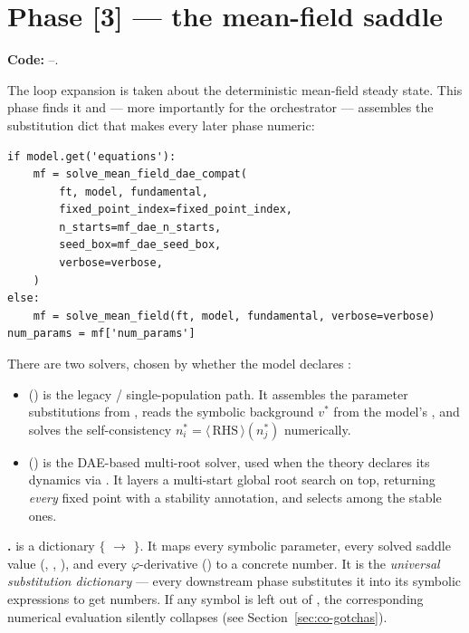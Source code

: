 \section{Phase [3] --- the mean-field saddle}\label{sec:co-mf}

\textbf{Code:} --.

The loop expansion is taken about the deterministic mean-field steady state. This
phase finds it and --- more importantly for the orchestrator --- assembles the
substitution dict that makes every later phase numeric:

\begin{lstlisting}
if model.get('equations'):
    mf = solve_mean_field_dae_compat(
        ft, model, fundamental,
        fixed_point_index=fixed_point_index,
        n_starts=mf_dae_n_starts,
        seed_box=mf_dae_seed_box,
        verbose=verbose,
    )
else:
    mf = solve_mean_field(ft, model, fundamental, verbose=verbose)
num_params = mf['num_params']
\end{lstlisting}

There are two solvers, chosen by whether the model declares :

\begin{itemize}
  \item {} () is the
        legacy / single-population path. It assembles the parameter substitutions
        from , reads the symbolic background $v^{*}$ from the
        model's , and solves the self-consistency
        $n^{*}_i = \langle\,\text{RHS}\,\rangle(n^{*}_j)$ numerically.
  \item {}
        () is the DAE-based multi-root
        solver, used when the theory declares its dynamics via
        . It layers a
        multi-start global root search on top, returning \emph{every} fixed point
        with a stability annotation, and  selects among
        the stable ones.
\end{itemize}

\begin{defn}
\textbf{.}  is a dictionary
$\{$ $\to$ $\}$. It
maps every symbolic parameter, every solved saddle value (,
, ), and every $\varphi$-derivative ()
to a concrete number. It is the \emph{universal substitution dictionary} ---
every downstream phase substitutes it into its symbolic expressions to get
numbers. If any symbol is left out of , the corresponding
numerical evaluation silently collapses (see Section~\ref{sec:co-gotchas}).
\end{defn}

